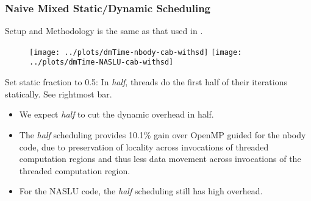 \begin{frame}[label=halftimings]
\frametitle{Naive Mixed Static/Dynamic Scheduling}
{\tiny Setup and Methodology is the same as that used in
  \hyperlink{basictimings}{}.} 
\begin{figure}[t]
\begin{center}
\texttt{[image: ../plots/dmTime-nbody-cab-withsd]}
\texttt{[image: ../plots/dmTime-NASLU-cab-withsd]}\\
\end{center}
\label{fig:dmTimes-NASLU-cab}
\end{figure}
\begin{center}
{\small Set static fraction to 0.5: In \textit{half}, threads do the
  first half of their iterations statically. See rightmost bar. }
\end{center}
\begin{itemize}
\tiny \item {\tiny We expect \textit{half} to cut the dynamic overhead in half.}
\item {\tiny The \textit{half} scheduling provides 10.1\% gain over
  OpenMP guided for the nbody code, due to preservation of locality
  across invocations of threaded computation regions and thus less
  data movement across invocations of the threaded computation
  region.}
\item {\tiny For the NASLU code, the \textit{half} scheduling still has high overhead.}
\end{itemize}
\end{frame}

